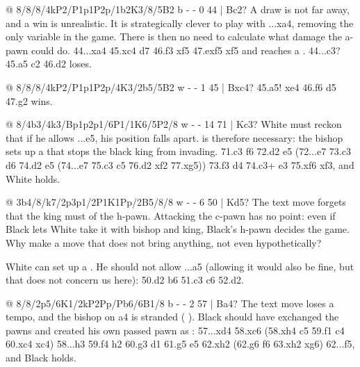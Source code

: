 @ 8/8/8/4kP2/P1p1P2p/1b2K3/8/5B2 b - - 0 44 | Bc2?
A draw is not far away, and a win is unrealistic. It is strategically clever to play 
with ...\B xa4, removing the only variable in the game. There is
then no need to calculate what damage the a-pawn could do. 44...\B xa4 45.\B xc4 \B d7 46.\K f3
\B xf5 47.exf5 \K xf5 
and reaches a . 44...c3? 45.a5 c2 46.\K d2
loses.

@ 8/8/8/4kP2/P1p1P2p/4K3/2b5/5B2 w - - 1 45 | Bxc4?
45.a5! \B xe4 46.f6 \B d5 47.\B g2 wins.

@ 8/4b3/4k3/Bp1p2p1/6P1/1K6/5P2/8 w - - 14 71 | Kc3?
White must reckon that if he allows ...\K e5, his position falls apart.
 is therefore necessary: the bishop sets up a  that stops the black king from
invading. 71.\B c3 \B f6 72.\B d2 \K e5 (72...\B e7 73.\B c3 \B d6 74.\B d2 \K e5 (74...\B e7
75.\B c3 \B c5 76.\B d2 \B xf2 77.\B xg5)) 73.f3 \K d4 74.\B c3+ \K e3 75.\B xf6 \K xf3, and
White holds.

@ 3b4/8/k7/2p3p1/2P1K1Pp/2B5/8/8 w - - 6 50 | Kd5?
The text move forgets that the king must  of the h-pawn.
Attacking the c-pawn has no point: even if Black lets White take it with bishop and king, Black's
h-pawn decides the game. Why make a move that does not bring anything, not even hypothetically?

White can set up a . He should not allow ...\B a5 (allowing it would also
be fine, but that does not concern us here): 50.\B d2 \K b6 51.\B c3 \K c6 52.\B d2.

@ 8/8/2p5/6K1/2kP2Pp/Pb6/6B1/8 b - - 2 57 | Ba4?
The text move loses a tempo, and the bishop on a4 is stranded (
). Black should have exchanged the
pawns and created his own passed pawn as :
57...\K xd4 58.\B xc6 (58.\K xh4 c5 59.\B f1 c4 60.\B xc4 \B xc4) 58...h3 59.\K f4 h2 60.\K g3
\B d1 61.g5 \K e5 62.\K xh2 (62.g6 \K f6 63.\K xh2 \K xg6) 62...\K f5, and Black holds.

